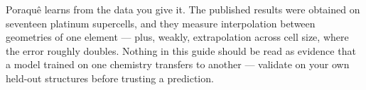 \begin{pwarn}
Poraqu\^e learns from the data you give it. The published results were obtained
on seventeen platinum supercells, and they measure interpolation between geometries of
one element --- plus, weakly, extrapolation across cell size, where the error
roughly doubles. Nothing in this guide should be read as evidence that a model
trained on one chemistry transfers to another --- validate on your own held-out
structures before trusting a prediction.
\end{pwarn}
